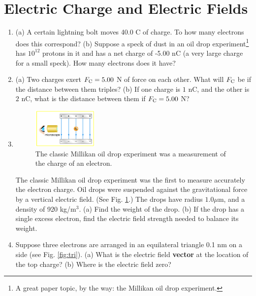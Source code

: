 \documentclass[10pt]{article}
\begin{document}
\clearpage

\section{Electric Charge and Electric Fields}

\begin{enumerate}
\item (a) A certain lightning bolt moves 40.0 C of charge.  To how many electrons does this correspond? (b) Suppose a speck of dust in an oil drop experiment\footnote{A great paper topic, by the way: the Millikan oil drop experiment.} has  $10^{12}$  protons in it and has a net charge of -5.00 nC (a very large charge for a small speck). How many electrons does it have?\\ \vspace{1cm}
\item (a) Two charges exert $F_{\rm C} = 5.00$ N of force on each other. What will $F_{\rm C}$ be if the distance between them triples? (b) If one charge is $1$ nC, and the other is $2$ nC, what is the distance between them if $F_{\rm C} = 5.00$ N? \\ \vspace{1cm}
\item 
\begin{figure}
\centering
\includegraphics[width=0.3\textwidth]{mill.jpeg}
\caption{\label{fig:mill} The classic Millikan oil drop experiment was a measurement of the charge of an electron.}
\end{figure}
The classic Millikan oil drop experiment was the first to measure accurately the electron charge. Oil drops were suspended against the gravitational force by a vertical electric field. (See Fig. \ref{fig:mill}.) The drops have radius $1.0 \mu$m, and a density of 920 kg/m$^3$. (a) Find the weight of the drop. (b) If the drop has a single excess electron, find the electric field strength needed to balance its weight. \\ \vspace{1.75cm}
\item Suppose three electrons are arranged in an equilateral triangle 0.1 nm on a side (see Fig. \ref{fig:tri}).  (a) What is the electric field \textbf{vector} at the location of the top charge? (b) Where is the electric field zero?

\end{enumerate}
\end{document}
